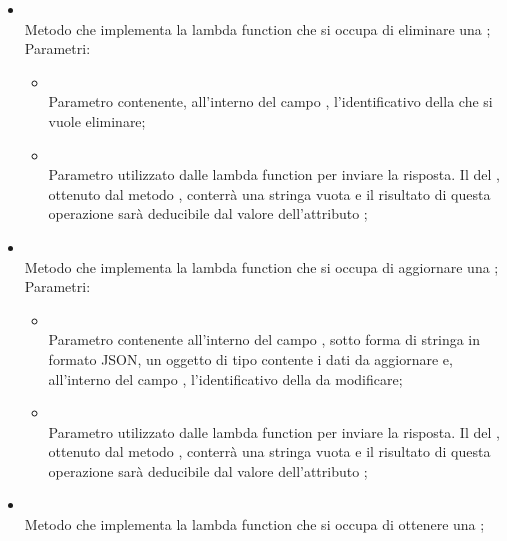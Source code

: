 \begin{itemize}
\begin{itemize}
\begin{itemize}
		\end{itemize}
		\item[]  \\
		Metodo che implementa la lambda function che si occupa di eliminare una ;\\
		Parametri:
		\begin{itemize}
			\item {} \\
			Parametro contenente, all'interno del campo , l'identificativo della  che si vuole eliminare;
			\item {} \\
			Parametro utilizzato dalle lambda function per inviare la risposta. Il  del , ottenuto dal metodo , conterrà una stringa vuota e il risultato di questa operazione sarà deducibile dal valore dell'attributo ;
		\end{itemize}
		\item[]  \\
		Metodo che implementa la lambda function che si occupa di aggiornare una ;\\
		Parametri:
		\begin{itemize}
			\item {} \\
			Parametro contenente all'interno del campo , sotto forma di stringa in formato JSON, un oggetto di tipo  contente i dati da aggiornare e, all'interno del campo , l'identificativo della  da modificare;
			\item {} \\
			Parametro utilizzato dalle lambda function per inviare la risposta. Il  del , ottenuto dal metodo , conterrà una stringa vuota e il risultato di questa operazione sarà deducibile dal valore dell'attributo ;
		\end{itemize}
		\item[]  \\
		Metodo che implementa la lambda function che si occupa di ottenere una ;\\

\end{itemize}
\end{itemize}

